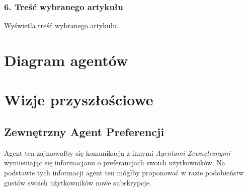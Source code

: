 \documentclass[a4paper,11pt]{report}
\begin{document}
\subsubsection*{6. Treść wybranego artykułu}
Wyświetla treść wybranego artykułu.

\section{Diagram agentów}

\section{Wizje przyszłościowe}


\subsection{Zewnętrzny Agent Preferencji}
Agent ten zajmowałby się komunikacją z innymi \textit{Agentami Zewnętrznymi}
wymieniając się informacjami o preferancjach swoich użytkowników. Na podstawie
tych informacji agent ten mógłby proponować w razie podobieństw gustów swoich
użytkowników nowe subskrypcje. 
\end{document}
